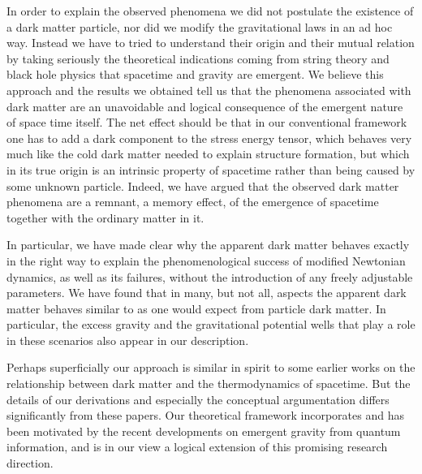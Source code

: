 \documentclass[a4paper,12pt]{article}
\makeatletter
\renewcommand\subsection{\@startsection{subsection}{2}{\z@}%
                                     {-3.25ex\@plus -1ex \@minus -.2ex}%
                                     {1.5ex \@plus .2ex}%
                                     {\normalfont\bfseries}}
\makeatother
\begin{document}
\noindent In order to explain the observed phenomena we did not postulate the existence of a dark matter particle, nor did we modify the gravitational laws in an ad hoc way. Instead we have to tried to understand their origin and their mutual relation by taking seriously the theoretical indications coming from string theory and black hole physics that spacetime and gravity are emergent. We believe this approach and the results we obtained tell us that  the phenomena associated with dark matter are an unavoidable and  logical consequence of the emergent nature of space time itself.  The net effect should be that in our conventional framework one has to add a dark component to the stress energy tensor, which behaves very much like the cold dark matter needed to explain structure formation, but which in its true origin is an intrinsic property of spacetime rather than being caused by some unknown particle.  Indeed, we have argued that the observed dark matter phenomena are a remnant, a memory effect, of the emergence of spacetime together with the ordinary matter in it.  

In particular, we have made clear why the apparent dark matter behaves exactly in the right way to explain the phenomenological success of modified Newtonian dynamics, as well as its failures, without the introduction of any freely adjustable parameters.    We have found that in 
many, but not all, aspects the apparent dark matter behaves similar to as one would expect from
particle dark matter. In particular, the excess gravity and the gravitational potential wells that play a role in these scenarios also appear in our description.  


Perhaps superficially our approach is similar in spirit to some earlier works \cite{Klinkhamer,Pikhitsa, Minic1, Minic2,Minic4} on the relationship between dark matter and the thermodynamics of spacetime. But the details of our derivations and especially the conceptual argumentation differs significantly from these papers. Our theoretical framework incorporates and has been motivated by the recent developments on emergent gravity from quantum information, and is in our view a logical extension of this promising research direction.  


\end{document}

